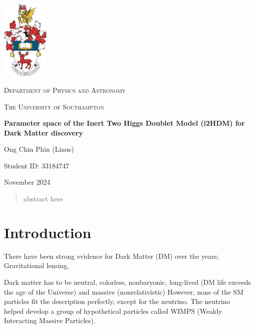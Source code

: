 \documentclass[12pt]{article}
\begin{document}
\begin{titlepage}
    \centering
    \includegraphics[width=2.3cm]{crest.jpg}\par
    \vspace{1cm}
    {\scshape\Large Department of Physics and Astronomy \par}
    \vspace{1cm}
    {\scshape\Large The University of Southampton \par}
    \vspace{1cm}
    \vspace{1cm}
    {\huge\bfseries Parameter space of the Inert Two Higgs Doublet Model (i2HDM) for Dark Matter discovery\par}
    \vspace{1cm}
    {\Large Ong Chin Phin (Linus) \par}
    \vspace{1cm}
    {\Large Student ID: 33184747 \par}
    \vfill
    {\large November 2024 \par}
\end{titlepage}

\newpage
\tableofcontents
\thispagestyle{empty}

\newpage
\thispagestyle{empty}
\begin{abstract}
abstract here
\end{abstract}

\newpage
\setcounter{page}{1}
\section{Introduction}
\label{sec:introduction}
There have been strong evidence for Dark Matter (DM) over the years; Gravitational lensing, %

Dark matter has to be neutral, colorless, nonbaryonic, long-lived (DM life exceeds the age of the Universe) and massive (nonrelativistic) %
However, none of the SM particles fit the description perfectly, except for the neutrino. The neutrino helped develop a group of hypothetical particles called WIMPS (Weakly Interacting Massive Particles).
\end{document}
